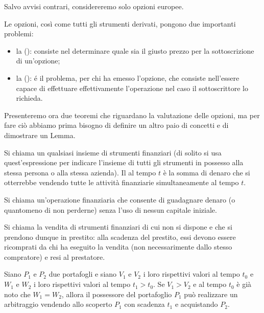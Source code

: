 	\par Salvo avvisi contrari, considereremo solo opzioni europee.
	\par Le opzioni, cos\`i come tutti gli strumenti derivati, pongono due importanti problemi:
\begin{itemize}
	\item la  (\Pricing): consiste nel determinare quale sia il giusto prezzo per la sottoscrizione di un'opzione;
	\item la  (\Hedging): \'e il problema, per chi ha emesso l'opzione, che consiste nell'essere capace di effettuare effettivamente l'operazione nel caso il sottoscrittore lo richieda.
\end{itemize}
	\par Presenteremo ora due teoremi che riguardano la valutazione delle opzioni, ma per fare ci\`o abbiamo prima bisogno di definire un altro paio di concetti e di dimostrare un Lemma.
\begin{Definition}\label{PortafoglioIntuitivo}
	Si chiama  un qualsiasi insieme di strumenti finanziari (di solito si usa quest'espressione per indicare l'insieme di tutti gli strumenti in possesso alla stessa persona o alla stessa azienda). Il  al tempo $t$ \`e la somma di denaro che si otterrebbe vendendo tutte le attivit\`a finanziarie simultaneamente al tempo $t$.
\end{Definition}
\begin{Definition}\label{ArbitraggioIntuitivo}
	Si chiama  un'operazione finanziaria che consente di guadagnare denaro (o quantomeno di non perderne) senza l'uso di nessun capitale iniziale.
\end{Definition}
\begin{Definition}
	Si chiama  la vendita di strumenti finanziari di cui non si dispone e che si prendono dunque in prestito: alla scadenza del prestito, essi devono essere ricomprati da chi ha eseguito la vendita (non necessarimente dallo stesso compratore) e resi al prestatore.
\end{Definition}
\begin{Lemma}\label{lemma_arbitraggio}
	Siano $P_1$ e $P_2$ due portafogli e siano $V_1$ e $V_2$ i loro rispettivi valori al tempo $t_0$ e $W_1$ e $W_2$ i loro rispettivi valori al tempo $t_1 > t_0$. Se $V_1 > V_2$ e al tempo $t_0$ \`e gi\`a noto che $W_1 = W_2$, allora il possessore del portafoglio $P_1$ pu\`o realizzare un arbitraggio vendendo allo scoperto $P_1$ con scadenza $t_1$ e acquistando $P_2$.
\end{Lemma}
